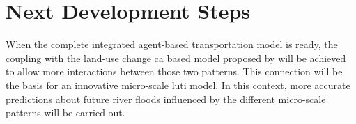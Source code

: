 \section{Next Development Steps}
When the complete integrated agent-based transportation model is ready, the coupling with the land-use change \gls{ca} based model proposed by \citet[][]{MustafaEtAl_PES_2014} will be achieved to allow more interactions between those two patterns. 
This connection will be the basis for an innovative micro-scale \gls{luti} model.
In this context, more accurate predictions about future river floods influenced by the different micro-scale patterns will be carried out.








